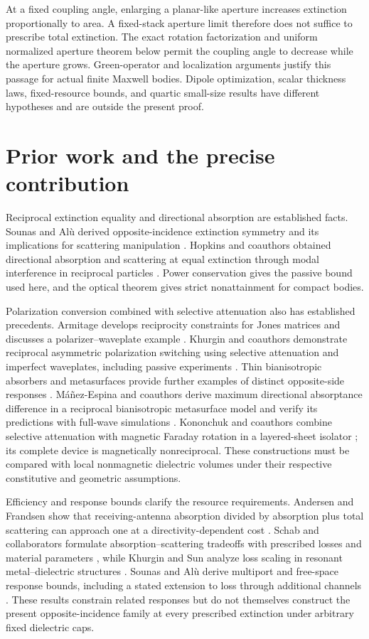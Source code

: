 \documentclass[11pt]{article}
\begin{document}
At a fixed coupling angle, enlarging a planar-like aperture increases extinction proportionally to area. A fixed-stack aperture limit therefore does not suffice to prescribe total extinction. The exact rotation factorization and uniform normalized aperture theorem below permit the coupling angle to decrease while the aperture grows. Green-operator and localization arguments justify this passage for actual finite Maxwell bodies. Dipole optimization, scalar thickness laws, fixed-resource bounds, and quartic small-size results have different hypotheses and are outside the present proof.

\section{Prior work and the precise contribution}\label{sec:prior}
Reciprocal extinction equality and directional absorption are established facts. Sounas and Al\`u derived opposite-incidence extinction symmetry and its implications for scattering manipulation \citep{SounasAlu2014}. Hopkins and coauthors obtained directional absorption and scattering at equal extinction through modal interference in reciprocal particles \citep{Hopkins2015}. Power conservation gives the passive bound used here, and the optical theorem gives strict nonattainment for compact bodies.

Polarization conversion combined with selective attenuation also has established precedents. Armitage develops reciprocity constraints for Jones matrices and discusses a polarizer--waveplate example \citep{Armitage2014}. Khurgin and coauthors demonstrate reciprocal asymmetric polarization switching using selective attenuation and imperfect waveplates, including passive experiments \citep{Khurgin2021}. Thin bianisotropic absorbers and metasurfaces provide further examples of distinct opposite-side responses \citep{Radi2013,Yazdi2015}. M\'a\~nez-Espina and coauthors derive maximum directional absorptance difference in a reciprocal bianisotropic metasurface model and verify its predictions with full-wave simulations \citep{ManezEspina2026}. Kononchuk and coauthors combine selective attenuation with magnetic Faraday rotation in a layered-sheet isolator \citep{Kononchuk2019}; its complete device is magnetically nonreciprocal. These constructions must be compared with local nonmagnetic dielectric volumes under their respective constitutive and geometric assumptions.

Efficiency and response bounds clarify the resource requirements. Andersen and Frandsen show that receiving-antenna absorption divided by absorption plus total scattering can approach one at a directivity-dependent cost \citep{AndersenFrandsen2005}. Schab and collaborators formulate absorption--scattering tradeoffs with prescribed losses and material parameters \citep{Schab2020}, while Khurgin and Sun analyze loss scaling in resonant metal--dielectric structures \citep{KhurginSun2011}. Sounas and Al\`u derive multiport and free-space response bounds, including a stated extension to loss through additional channels \citep{SounasAlu2017}. These results constrain related responses but do not themselves construct the present opposite-incidence family at every prescribed extinction under arbitrary fixed dielectric caps.
\end{document}
